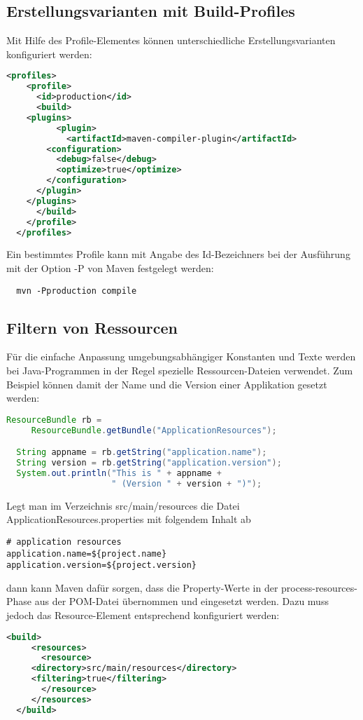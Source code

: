 \subsection{Erstellungsvarianten mit Build-Profiles}
Mit Hilfe des Profile-Elementes können unterschiedliche
Erstellungsvarianten konfiguriert werden:
\begin{lstlisting}[language=xml,
  morekeywords={profiles,profile,id,build,plugins,plugin,artifactId,
    configuration,debug,optimize}]
  <profiles>
    <profile>
      <id>production</id>
      <build>
	<plugins>
          <plugin>
            <artifactId>maven-compiler-plugin</artifactId>
	    <configuration>
	      <debug>false</debug>
	      <optimize>true</optimize>
	    </configuration>
	  </plugin>
	</plugins>
      </build>
    </profile>
  </profiles>
\end{lstlisting}
Ein bestimmtes Profile kann mit Angabe des Id-Bezeichners bei der
Ausführung mit der Option -P von Maven festgelegt werden:
\begin{lstlisting}
  mvn -Pproduction compile
\end{lstlisting}
\newslide
\subsection{Filtern von Ressourcen}
Für die einfache Anpassung umgebungsabhängiger Konstanten und Texte werden
bei Java-Programmen in der Regel spezielle Ressourcen-Dateien verwendet.
Zum Beispiel können damit der Name und die Version einer Applikation
gesetzt werden:
\begin{lstlisting}[language=java]
  ResourceBundle rb =
     ResourceBundle.getBundle("ApplicationResources");

  String appname = rb.getString("application.name");
  String version = rb.getString("application.version");
  System.out.println("This is " + appname +
                     " (Version " + version + ")");
\end{lstlisting}
\newslide
Legt man im Verzeichnis src/main/resources die Datei
ApplicationResources.properties mit folgendem Inhalt ab
\begin{lstlisting}
# application resources
application.name=${project.name}
application.version=${project.version}
\end{lstlisting}
dann kann Maven dafür sorgen, dass die Property-Werte in der
process-resources-Phase aus der POM-Datei übernommen und eingesetzt
werden.
\newslide
Dazu muss jedoch das
Resource-Element entsprechend konfiguriert werden:
\begin{lstlisting}[language=xml,
morekeywords={build,resources,resource,directory,filtering}]
   <build>
     <resources>
       <resource>
	 <directory>src/main/resources</directory>
	 <filtering>true</filtering>
       </resource>
     </resources>
  </build>
\end{lstlisting}
\newslide
%
